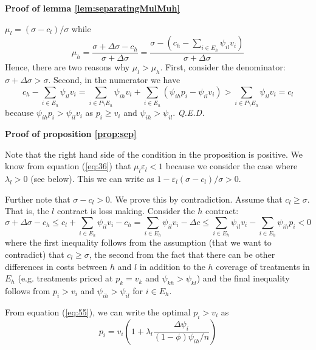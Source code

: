 \documentclass[12pt,english,a4paper]{article}
\newcommand{\qed}{\hspace*{\fill} {\em Q.E.D.}}
\begin{document}
\textbf{Proof of lemma \ref{lem:separatingMulMuh}}

\(\mu_l = (\sigma-c_l)/\sigma\) while
\begin{equation}
\label{eq:59}
\mu_h = \frac{\sigma+\Delta\sigma - c_h}{\sigma+\Delta\sigma}=\frac{\sigma-(c_h-\sum_{i \in E_h} \psi_{il} v_i)}{\sigma+\Delta\sigma}
\end{equation}
Hence, there are two reasons why \(\mu_l > \mu_h\). First, consider the denominator: \(\sigma+\Delta\sigma>\sigma\). Second, in the numerator we have
\begin{equation}
\label{eq:67}
c_h-\sum_{i \in E_h} \psi_{il} v_i = \sum_{i \in P \setminus E_h} \psi_{ih}v_i + \sum_{i \in E_h} (\psi_{ih}p_i-\psi_{il}v_i) > \sum_{i \in P \setminus E_h} \psi_{il} v_i = c_l
\end{equation}
because \(\psi_{ih}p_i > \psi_{il}v_i\) as \(p_i \geq v_i\) and \(\psi_{ih}>\psi_{il}\).\qed

\textbf{Proof of proposition \ref{prop:sep}}

Note that the right hand side of the condition in the proposition is positive. We know from equation (\ref{eq:36}) that \(\mu_l \varepsilon_l<1\) because we consider the case where \(\lambda_l > 0\) (see below). This we can write as \(1-\varepsilon_l (\sigma-c_l)/\sigma >0\).

Further note that \(\sigma-c_l >0\). We prove this by contradiction. Assume that \(c_l \geq \sigma\). That is, the \(l\) contract is loss making. Consider the \(h\) contract:
\begin{equation}
\label{eq:46}
\sigma+\Delta \sigma - c_h \leq c_l + \sum_{i \in E_h} \psi_{il} v_i - c_h =  \sum_{i \in E_h} \psi_{il} v_i - \Delta c \leq \sum_{i \in E_h} \psi_{il} v_i - \sum_{i \in E_h} \psi_{ih} p_i < 0
\end{equation}
where the first inequality follows from the assumption (that we want to contradict) that \(c_l \geq \sigma\), the second from the fact that there can be other differences in costs between \(h\) and \(l\) in addition to the \(h\) coverage of treatments in \(E_h\) (e.g. treatments priced at \(p_k=v_k\) and \(\psi_{kh}>\psi_{kl}\)) and the final inequality follows from \(p_i>v_i\) and \(\psi_{ih} > \psi_{il}\) for \(i \in E_h\).

From equation (\ref{eq:55}), we can write the optimal \(p_i>v_i\) as
\begin{equation}
\label{eq:60}
p_i = v_i \left( 1+ \lambda_l \frac{\Delta\psi_i}{(1-\phi)\psi_{ih}/n} \right)
\end{equation}
\end{document}
